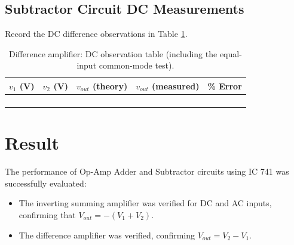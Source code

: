 \subsection{Subtractor Circuit DC Measurements}
Record the DC difference observations in Table \ref{tab:dc_subtractor}.
\begin{table}[h!]
	\centering
	\begin{tabular}{@{}ccccc@{}}
		\toprule
		$v_1$ (V) & $v_2$ (V) & $v_{out}$ (theory) & $v_{out}$ (measured) & \% Error \\
		\midrule
		&  &  &  &  \\
		&  &  &  &  \\
		&  &  &  &  \\
		&  &  &  &  \\
		\bottomrule
	\end{tabular}
	\caption{Difference amplifier: DC observation table (including the equal-input common-mode test).}
	\label{tab:dc_subtractor}
\end{table}

\section{Result}
The performance of Op-Amp Adder and Subtractor circuits using IC 741 was successfully evaluated:
\begin{itemize}
	\item The inverting summing amplifier was verified for DC and AC inputs, confirming that $V_{out} = -(V_1 + V_2)$.
	\item The difference amplifier was verified, confirming $V_{out} = V_2 - V_1$.
\end{itemize}

